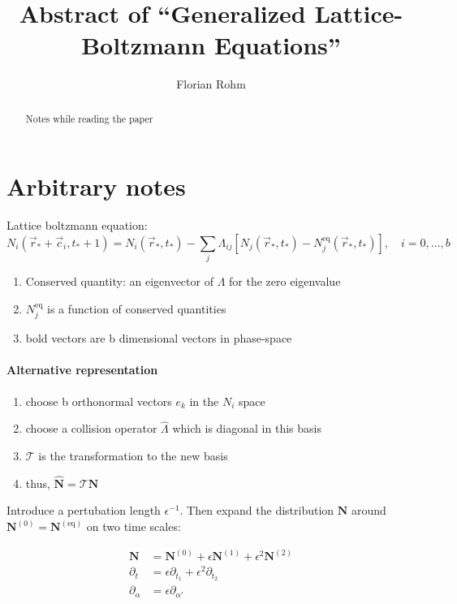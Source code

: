 \documentclass[]{article}
\title{Abstract of ``Generalized Lattice-Boltzmann Equations''}
\author{Florian Rohm}
\begin{document}
\maketitle

\begin{abstract}
Notes while reading the paper
\end{abstract}

\section{Arbitrary notes}

Lattice boltzmann equation:
\begin{equation}
	\label{eq:latticeBoltzmann}
	N_i(\vec{r}_{*} + \vec{c}_i, t_{*} + 1) = N_i (\vec{r}_{*}, t_{*}) - \sum_j \Lambda_{ij} [N_j(\vec{r}_{*}, t_{*}) - N_j^{\text{eq}} (\vec{r}_{*}, t_{*})], \quad i = 0, \dots, b
\end{equation}
\begin{enumerate}
  \item Conserved quantity: an eigenvector of $\Lambda$ for the zero eigenvalue
  \item $N_j^{\text{eq}}$ is a function of conserved quantities
  \item bold vectors are b dimensional vectors in phase-space
\end{enumerate}

\paragraph{Alternative representation}
\label{par:Alternative representation}

\begin{enumerate}
  \item choose b orthonormal vectors $e_k$ in the $N_i$ space
  \item choose a collision operator $\hat{\Lambda}$ which is diagonal in this basis
  \item $\mathcal{T}$ is the transformation to the new basis
  \item thus, $\boldsymbol{\hat{N}} = \mathcal{T} \boldsymbol{N}$
\end{enumerate}
\label{sub:Chapman-Enskog}
Introduce a pertubation length $\epsilon^{-1}$.
Then expand the distribution $\boldsymbol{N}$ around $\boldsymbol{N}^{(0)} = \boldsymbol{N}^{(\text{eq})}$ on two time scales:

\begin{align}
  \boldsymbol{N} &= \boldsymbol{N}^{(0)} + \epsilon \boldsymbol{N}^{(1)}+ \epsilon^2 \boldsymbol{N}^{(2)}    \label{eq:expandN} \\
  \partial_t &= \epsilon\partial_{t_1} + \epsilon^2\partial_{t_2} \label{eq:expandPartialt}\\
	\partial_\alpha &= \epsilon\partial_{\alpha'} \label{eq:expandPartialAlpha}
\end{align}
\end{document}
